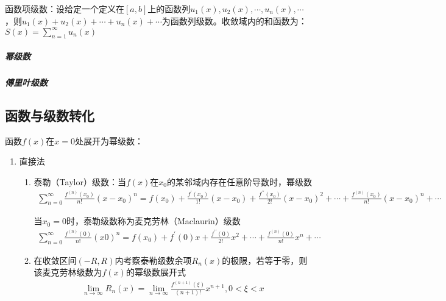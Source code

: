 \documentclass[12pt]{book}
\begin{document}
函数项级数：设给定一个定义在$[a,b]$上的函数列$u_1(x),u_2(x),\cdots,u_n(x),\cdots$，则$u_1(x)+u_2(x)+\cdots+u_n(x)+\cdots$为函数列级数。收敛域内的和函数为：$S(x)=\sum_{n=1}^{\infty}{ u_n(x) }$




\subparagraph{幂级数}


\subparagraph{傅里叶级数}



\subsection{函数与级数转化}


函数$f(x)$在$x=0$处展开为幂级数：
\begin{enumerate}[1.]
    \item 直接法
          \begin{enumerate}[(1)]
              \item 泰勒（Taylor）级数：当$f(x)$在$x_0$的某邻域内存在任意阶导数时，幂级数
                    \begin{gather*}
                        \sum_{n=0}^{\infty}{
                        \frac{f^{(n)}(x_0)}{n!}(x-x_0)^n
                        } =
                        f(x_0)+
                        \frac{f^\prime(x_0)}{1!}(x-x_0)+
                        \frac{f^{\prime\prime}(x_0)}{2!}(x-x_0)^{2}+\cdots+
                        \frac{f^{(n)}(x_0)}{n!}(x-x_0)^{n}+\cdots
                    \end{gather*}
                    \par 当$x_0=0$时，泰勒级数称为麦克劳林（Maclaurin）级数
                    \begin{gather*}
                        \sum_{n=0}^{\infty}{
                        \frac{f^{(n)}(0)}{n!}(x0)^n
                        } =
                        f(x_0)+
                        f^\prime(0)x+
                        \frac{f^{\prime\prime}(0)}{2!}x^{2}+\cdots+
                        \frac{f^{(n)}(0)}{n!}x^{n}+\cdots
                    \end{gather*}
              \item 在收敛区间$(-R,R)$内考察泰勒级数余项$R_{n}(x)$的极限，若等于零，则该麦克劳林级数为$f(x)$的幂级数展开式
                    \begin{gather*}
                        \lim_{n\rightarrow\infty}{R_{n}(x)} = \lim_{n\rightarrow\infty}{\frac{f^{(n+1)}(\xi)}{(n+1)!}x^{n+1}}, 0<\xi<x
                    \end{gather*}
          \end{enumerate}

\end{enumerate}
\end{document}
